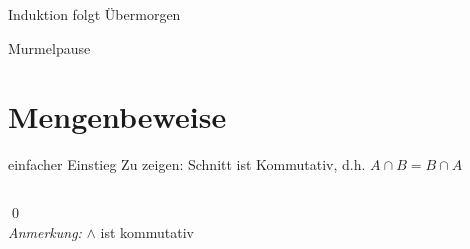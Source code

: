 \begin{frame}[standout]
  Induktion folgt Übermorgen
\end{frame}

\begin{frame}[standout]
    Murmelpause
\end{frame}


\section{Mengenbeweise}

\begin{frame}{einfacher Einstieg}
        \onslide
            Zu zeigen: Schnitt ist Kommutativ, d.h. $A \cap B = B \cap A$
        \begin{columns}
        \end{columns}
        \qed\\
    \small{\emph{Anmerkung:} $\wedge$ ist kommutativ}
\end{frame}

